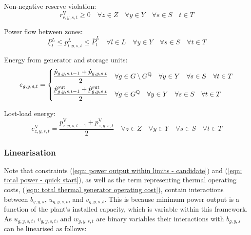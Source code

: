 \documentclass{article}
\newcommand{\sGenerators}{G}
\newcommand{\sStorage}{G^{\mathrm{Q}}}
\newcommand{\sYears}{Y}
\newcommand{\sScenarios}{S}
\newcommand{\sIntervals}{T}
\newcommand{\sZones}{Z}
\newcommand{\sLinks}{L}
\newcommand{\iGenerator}{g}
\newcommand{\iYear}{y}
\newcommand{\iScenario}{s}
\newcommand{\iInterval}{t}
\newcommand{\iZone}{z}
\newcommand{\iRegion}{r}
\newcommand{\iLink}{l}
\newcommand{\cPowerFlowMin}{\underline{P}_{\iLink}^{L}}
\newcommand{\cPowerFlowMax}{\overline{P}_{\iLink}^{L}}
\newcommand{\vEnergy}[1][\iGenerator,\iYear,\iScenario,\iInterval]{e_{#1}}
\newcommand{\vStartupIndicator}[1][\iGenerator,\iYear,\iScenario,\iInterval]{v_{#1}}
\newcommand{\vShutdownIndicator}[1][\iGenerator,\iYear,\iScenario,\iInterval]{w_{#1}}
\newcommand{\vReserveUpViolation}[1][\iRegion,\iYear,\iScenario,\iInterval]{r^{\mathrm{V}}_{#1}}
\newcommand{\vOnIndicator}[1][\iGenerator,\iYear,\iScenario,\iInterval]{u_{#1}}
\newcommand{\vPowerTotal}[1][\iGenerator,\iYear,\iScenario,\iInterval]{\hat{p}_{#1}}
\newcommand{\vPowerTotalOut}[1][\iGenerator,\iYear,\iScenario,\iInterval]{\hat{p}^{\mathrm{out}}_{#1}}
\newcommand{\vPowerFlow}[1][\iLink,\iYear,\iScenario,\iInterval]{p^{\sLinks}_{#1}}
\newcommand{\vLostLoadEnergy}[1][\iZone,\iYear,\iScenario,\iInterval]{e^{\mathrm{V}}_{#1}}
\newcommand{\vLostLoadPower}[1][\iZone,\iYear,\iScenario,\iInterval]{p^{\mathrm{V}}_{#1}}
\newcommand{\vInstalledCapacityTotalScenario}[1][\iGenerator,\iYear,\iScenario]{b_{#1}}
\begin{document}
Non-negative reserve violation:
\begin{equation}
\vReserveUpViolation \geq 0 \quad \forall \iZone \in \sZones \quad \forall \iYear \in \sYears \quad \forall \iScenario \in \sScenarios \quad \iInterval \in \sIntervals
\end{equation}

Power flow between zones:
\begin{equation}
\cPowerFlowMin \leq \vPowerFlow \leq \cPowerFlowMax \quad \forall \iLink \in \sLinks \quad \forall \iYear \in \sYears \quad \forall \iScenario \in \sScenarios \quad \forall \iInterval \in \sIntervals
\label{eqn: powerflow constraints}
\end{equation}

Energy from generator and storage units:
\begin{equation}
\vEnergy = \begin{dcases}
\frac{\vPowerTotal[\iGenerator, \iYear,\iScenario,\iInterval-1] + \vPowerTotal}{2} & \forall \iGenerator \in \sGenerators \setminus \sStorage \quad \forall \iYear \in \sYears \quad \forall \iScenario \in \sScenarios \quad \forall \iInterval \in \sIntervals\\
\frac{\vPowerTotalOut[\iGenerator, \iYear,\iScenario,\iInterval-1] + \vPowerTotalOut}{2} & \forall \iGenerator \in \sStorage \quad \forall \iYear \in \sYears \quad \forall \iScenario \in \sScenarios \quad \forall \iInterval \in \sIntervals\\
\end{dcases}
\end{equation}

Lost-load energy:
\begin{equation}
\vLostLoadEnergy = \frac{\vLostLoadPower[\iZone, \iYear,\iScenario,\iInterval-1] + \vLostLoadPower}{2} \quad \forall \iZone \in \sZones \quad \forall \iYear \in \sYears \quad \forall \iScenario \in \sScenarios \quad \forall \iInterval \in \sIntervals
\label{eqn: lost-load energy constraint}
\end{equation}

\subsubsection{Linearisation}
Note that constraints (\ref{eqn: power output within limits - candidate}) and (\ref{eqn: total power - quick start}), as well as the term representing thermal operating costs, (\ref{eqn: total thermal generator operating cost}), contain interactions between $\vInstalledCapacityTotalScenario$, $\vOnIndicator$, and $\vStartupIndicator$. This is because minimum power output is a function of the plant's installed capacity, which is variable within this framework. As $\vOnIndicator$, $\vStartupIndicator$, and $\vShutdownIndicator$ are binary variables their interactions with $\vInstalledCapacityTotalScenario$ can be linearised as follows:
\end{document}
